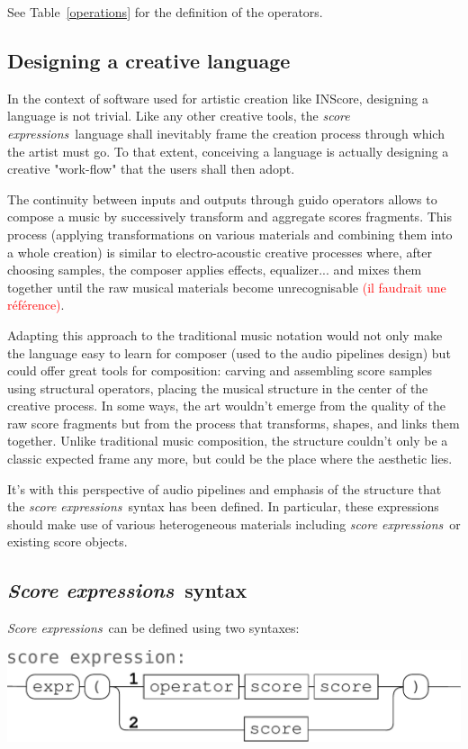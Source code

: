 \documentclass{article}
\newcommand{\note}[1]{\textcolor{red}{(#1)}}
\newcommand{\sExpr}{\emph{score expressions}}
\newcommand{\SExpr}{\emph{Score expressions}}
\begin{document}
See Table~\ref{operations} for the definition of the operators.

\subsection{Designing a creative language}
In the context of software used for artistic creation like INScore, designing a language is not trivial. Like any other creative tools,  the \sExpr\ language shall inevitably frame the creation process through which the artist must go. To that extent, conceiving a language is actually designing a creative "work-flow" that the users shall then adopt.

The continuity between inputs and outputs through guido operators allows to compose a music by successively transform and aggregate scores fragments. This process (applying transformations on various materials and combining them into a whole creation) is similar to electro-acoustic creative processes where, after choosing samples, the composer applies effects, equalizer... and mixes them together until the raw musical materials become unrecognisable \note{il faudrait une référence}.

Adapting this approach to the traditional music notation would not only make the language easy to learn for composer (used to the audio pipelines design) but could offer great tools for composition: carving and assembling score samples using structural operators, placing the musical structure
 in the center of the creative process. In some ways, the art wouldn't emerge from the quality of the raw score fragments but from the process that transforms, shapes, and links them together. Unlike traditional music composition, the structure couldn't only be a classic expected frame any more, but could be the place where the aesthetic lies.

It's with this perspective of audio pipelines and emphasis of the structure that the \sExpr\ syntax has been defined. In particular, these expressions should make use of various heterogeneous materials including \sExpr\ or existing score objects.

\subsection{\SExpr\ syntax}
\smallbreak
\SExpr\ can be defined using two syntaxes:
\begin{center}
\includegraphics[width=0.9\columnwidth]{imgs/syntax1}
\end{center}
\end{document}
